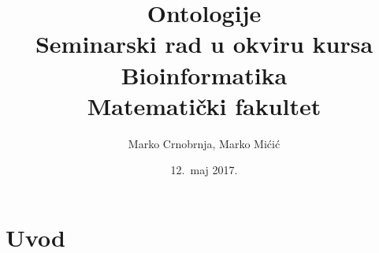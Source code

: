 \documentclass[a4paper]{article}
\begin{document}
\title{Ontologije \\ \small{Seminarski rad u okviru kursa\\Bioinformatika\\ Matematički fakultet}}

\author{Marko Crnobrnja, Marko Mićić}
\date{12.~maj 2017.}
\maketitle

\abstract{}


\tableofcontents

\newpage

\section{Uvod}
\label{sec:uvod}
\end{document}

